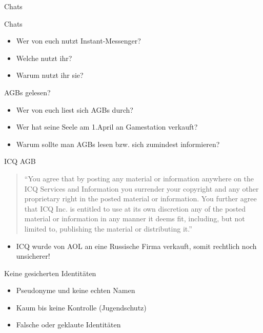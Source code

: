 \begin{frame}
Chats
\end{frame}

\begin{frame}{Chats}
	\begin{itemize}
		\item Wer von euch nutzt Instant-Messenger?
		\item<2-> Welche nutzt ihr?
		\item<3-> Warum nutzt ihr sie?
	\end{itemize}
\end{frame}

\begin{frame}{AGBs gelesen?}
	\begin{itemize}
		\item Wer von euch liest sich AGBs durch?
		\item<2-> Wer hat seine Seele am 1.April an Gamestation verkauft?%
		\item<3-> Warum sollte man AGBs lesen bzw. sich zumindest informieren?
	\end{itemize}
\end{frame}
\begin{frame}{ICQ AGB}
	\begin{quotation}
		"`You agree that by posting any material or information anywhere on the ICQ Services 
		and Information you surrender your copyright and any other proprietary right in the
		posted material or information. You further agree that ICQ Inc. is entitled to use at 
		its own discretion any of the posted material or information in any manner it deems fit, 
		including, but not limited to, publishing the material or distributing it."'%
	\end{quotation}
	\begin{itemize}
		\item ICQ wurde von AOL an eine Russische Firma verkauft, somit rechtlich noch unsicherer!
	\end{itemize}
\end{frame}

\begin{frame}{Keine gesicherten Identitäten}
	\begin{itemize}
		\item Pseudonyme und keine echten Namen
		\item Kaum bis keine Kontrolle (Jugendschutz)
		\item Falsche oder geklaute Identit\"aten
	\end{itemize}
\end{frame}

